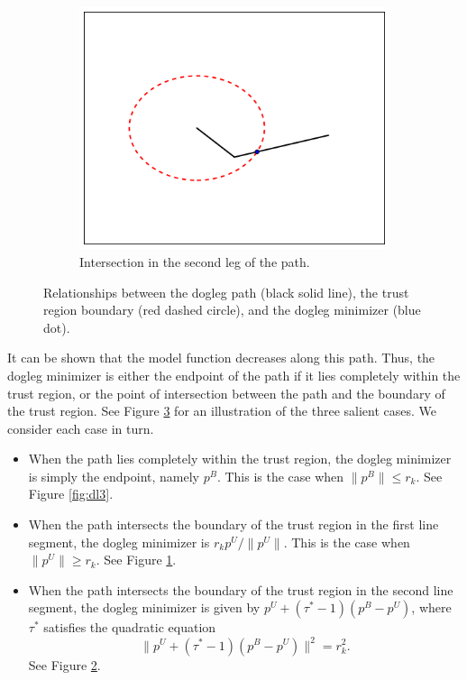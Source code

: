 \begin{figure}
\begin{subfigure}[b]{0.3\textwidth}
            \label{fig:dl1}
    \end{subfigure}
    ~ %
    \begin{subfigure}[b]{0.3\textwidth}
            \includegraphics[width=\textwidth]{dogleg2}
            \caption{Intersection in the second leg of the path.}
            \label{fig:dl2}
    \end{subfigure}
    \caption{Relationships between the dogleg path (black solid line),
    the trust region boundary (red dashed circle), and the dogleg minimizer (blue dot).}
    \label{fig:dogleg}
\end{figure}

It can be shown that the model function decreases along this path. Thus,
the dogleg minimizer is either the endpoint of the path if it lies completely within the trust region,
or the point of intersection between the path and the boundary of the trust region. 
See Figure \ref{fig:dogleg} for an illustration of the three salient cases. We consider each case in turn.
\begin{itemize}
\item
When the path lies completely within the trust region, the dogleg minimizer is simply the endpoint, namely $p^B$.
This is the case when $\|p^B\| \leq r_k$. See Figure \ref{fig:dl3}. 
\item
When the path intersects the boundary of the trust region in the first line segment, the dogleg minimizer is 
$r_kp^U/\|p^U\|$. 
This is the case when $\|p^U\| \geq r_k$. See Figure \ref{fig:dl1}.
\item
When the path intersects the boundary of the trust region in the second line segment, the dogleg minimizer is
given by $p^U + (\tau^*-1)(p^B-p^U)$, where $\tau^*$ satisfies the quadratic equation
\[
\|p^U + (\tau^*-1)(p^B-p^U)\|^2 = r_k^2.
\]
See Figure \ref{fig:dl2}.
\end{itemize}

